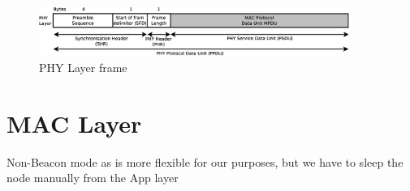 \begin{itemize}
\vspace*{1cm}

\begin{figure}[here]
 \begin{center}
  \includegraphics[width=0.9\textwidth]{PPDU.eps}
 \end{center}
 \caption{\ac{PHY} Layer frame \cite{IEEE802.15.4-2003}}
 \label{fig:PPDU}
\end{figure}
\end{itemize}



\section{\ac{MAC} Layer}

Non-Beacon mode as is more flexible for our purposes, but we have to sleep the node manually from the App layer

